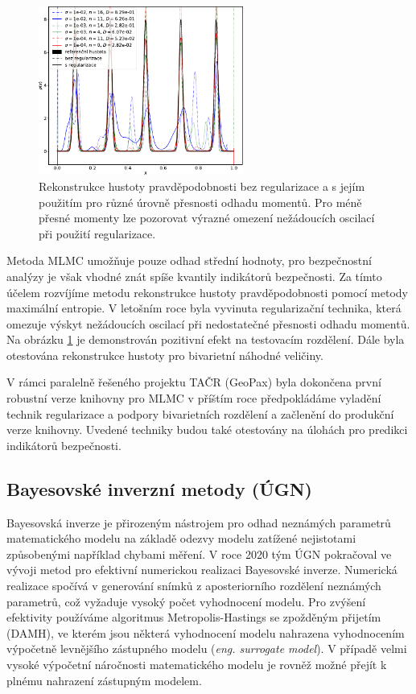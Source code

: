 \documentclass[11pt,a4paper]{article}
\begin{document}
\begin{onehalfspacing}
\begin{figure}
    \centering
    \includegraphics[width=0.6\textwidth]{graphics/five_fingers_regul.pdf}
    \caption{Rekonstrukce hustoty pravděpodobnosti bez regularizace a s jejím použitím pro různé úrovně přesnosti odhadu momentů. Pro méně přesné momenty lze pozorovat výrazné omezení nežádoucích oscilací při použití regularizace.}
    \label{fig:hustota_regul}
\end{figure}


Metoda MLMC umožňuje pouze odhad střední hodnoty, pro bezpečnostní analýzy je však vhodné znát spíše kvantily indikátorů bezpečnosti.
Za tímto účelem rozvíjíme metodu rekonstrukce hustoty pravděpodobnosti pomocí metody maximální entropie. V letošním roce byla vyvinuta 
regularizační technika, která omezuje výskyt nežádoucích oscilací při nedostatečné přesnosti odhadu momentů. Na obrázku 
\ref{fig:hustota_regul} je demonstrován pozitivní efekt na testovacím rozdělení. Dále byla otestována rekonstrukce hustoty pro bivarietní náhodné veličiny.

V rámci paralelně řešeného projektu TAČR (GeoPax) byla dokončena první robustní verze knihovny pro MLMC v příštím roce předpokládáme vyladění technik regularizace a podpory bivarietních rozdělení a začlenění do produkční verze knihovny. Uvedené techniky budou také otestovány na 
úlohách pro predikci indikátorů bezpečnosti.

\subsection{Bayesovské inverzní metody (ÚGN)}

Bayesovská inverze je přirozeným nástrojem pro odhad neznámých parametrů matematického modelu na základě odezvy modelu zatížené nejistotami způsobenými například chybami měření. V roce 2020 tým ÚGN pokračoval ve vývoji metod pro efektivní numerickou realizaci Bayesovské inverze. Numerická realizace spočívá v generování snímků  z aposteriorního rozdělení neznámých parametrů, což vyžaduje vysoký počet vyhodnocení modelu. Pro zvýšení efektivity používáme algoritmus Metropolis-Hastings se zpožděným přijetím (DAMH), ve kterém jsou některá vyhodnocení modelu nahrazena vyhodnocením výpočetně levnějšího zástupného modelu ({\it eng. surrogate model}). V případě velmi vysoké výpočetní náročnosti matematického modelu je rovněž možné přejít k plnému nahrazení zástupným modelem.


\end{onehalfspacing}
\end{document}
